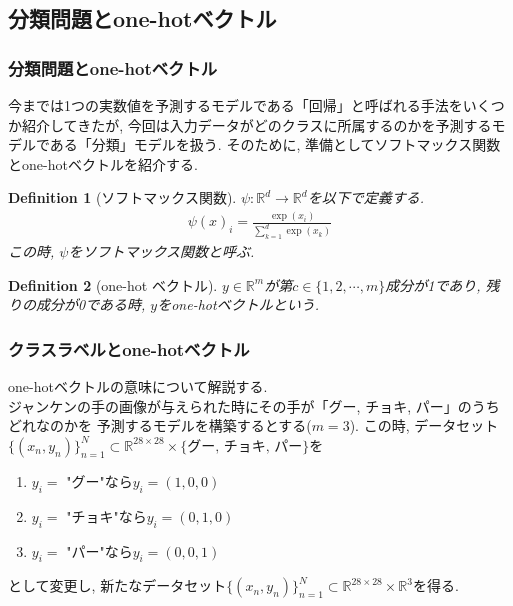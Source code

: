 \documentclass[dvipdfmx,11pt]{beamer}		%
\newtheorem{defi}{Definition}
\newcommand{\R}{\mathbb{R}}
\begin{document}
    \subsection{分類問題とone-hotベクトル}
    \begin{frame}
        \frametitle{分類問題とone-hotベクトル}
        今までは1つの実数値を予測するモデルである「回帰」と呼ばれる手法をいくつか紹介してきたが, 
        今回は入力データがどのクラスに所属するのかを予測するモデルである「分類」モデルを扱う. 
        そのために, 準備としてソフトマックス関数とone-hotベクトルを紹介する. 
        \begin{defi}[ソフトマックス関数]
            $\psi:\R^d\to\R^d$を以下で定義する.
            \begin{align*}
                \psi(x)_{i} = \frac{\exp(x_i)}{\sum_{k = 1}^d\exp(x_k)}
            \end{align*}
            この時, $\psi$をソフトマックス関数と呼ぶ.
        \end{defi}
        \begin{defi}[one-hot ベクトル]
            $y\in\R^m$が第$c\in\{1, 2, \cdots, m\}$成分が1であり, 残りの成分が0である時, 
            $y$をone-hotベクトルという.
        \end{defi}
    \end{frame}
    \begin{frame}
        \frametitle{クラスラベルとone-hotベクトル}
        one-hotベクトルの意味について解説する. \\
        ジャンケンの手の画像が与えられた時にその手が「グー, チョキ, パー」のうちどれなのかを
        予測するモデルを構築するとする($m = 3$). 
        この時, データセット$\{(x_{n}, y_{n})\}_{n = 1}^{N}\subset \R^{28\times 28}\times\{\text{グー, チョキ, パー}\}$を
        \begin{enumerate}
            \item $y_{i} =$ "グー"なら$y_i = (1, 0, 0)$
            \item $y_{i} =$ "チョキ"なら$y_i = (0, 1, 0)$
            \item $y_{i} =$ "パー"なら$y_i = (0, 0, 1)$
        \end{enumerate}
        として変更し, 新たなデータセット$\{(x_{n}, y_{n})\}_{n = 1}^{N}\subset \R^{28\times 28}\times\R^3$を得る. 
    \end{frame}
\end{document}
